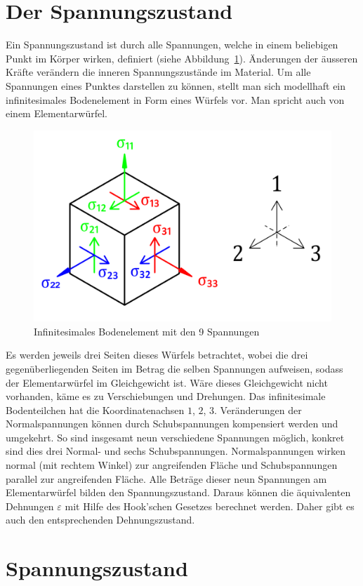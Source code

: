 \section{Der Spannungszustand\label{spannung:section:Der Spannungsustand}}
Ein Spannungszustand ist durch alle Spannungen, welche in einem beliebigen Punkt im Körper wirken, definiert (siehe Abbildung~\ref{fig:Bild2}).
Änderungen der äusseren Kräfte verändern die inneren Spannungszustände im Material.
Um alle Spannungen eines Punktes darstellen zu können,
stellt man sich modellhaft ein infinitesimales Bodenelement in Form eines Würfels vor.
Man spricht auch von einem Elementarwürfel.

\begin{figure}
	\centering
	\includegraphics[width=0.4\linewidth,keepaspectratio]{papers/spannung/Grafiken/Bild2.png}
	\caption{Infinitesimales Bodenelement mit den 9 Spannungen}
	\label{fig:Bild2}
\end{figure}

Es werden jeweils drei Seiten dieses Würfels betrachtet, wobei die drei gegenüberliegenden Seiten im Betrag die selben Spannungen aufweisen,
sodass der Elementarwürfel im Gleichgewicht ist.
Wäre dieses Gleichgewicht nicht vorhanden, käme es zu Verschiebungen und Drehungen.
Das infinitesimale Bodenteilchen hat die Koordinatenachsen $1$, $2$, $3$.
Veränderungen der Normalspannungen können durch Schubspannungen kompensiert werden und umgekehrt.
So sind insgesamt neun verschiedene Spannungen möglich, konkret sind dies drei Normal- und sechs Schubspannungen.
Normalspannungen wirken normal (mit rechtem Winkel) zur angreifenden Fläche und Schubspannungen parallel zur angreifenden Fläche.
Alle Beträge dieser neun Spannungen am Elementarwürfel bilden den Spannungszustand.
Daraus können die äquivalenten Dehnungen $\varepsilon$ mit Hilfe des Hook'schen Gesetzes berechnet werden.
Daher gibt es auch den entsprechenden Dehnungszustand.


\section{Spannungszustand\label{spannung:section:Spannungsustand}}

